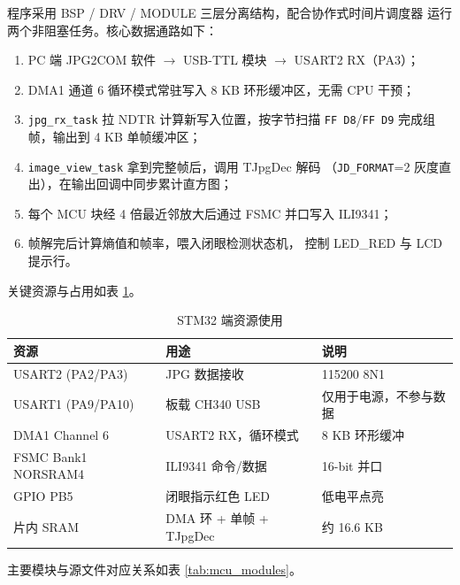 \documentclass[a4paper]{article}
\begin{document}
程序采用 BSP / DRV / MODULE 三层分离结构，配合协作式时间片调度器
运行两个非阻塞任务。核心数据通路如下：

\begin{enumerate}
\item PC 端 JPG2COM 软件 $\to$ USB-TTL 模块 $\to$ USART2 RX（PA3）；
\item DMA1 通道 6 循环模式常驻写入 8 KB 环形缓冲区，无需 CPU 干预；
\item \texttt{jpg\_rx\_task} 拉 NDTR 计算新写入位置，按字节扫描
\texttt{FF D8}/\texttt{FF D9} 完成组帧，输出到 4 KB 单帧缓冲区；
\item \texttt{image\_view\_task} 拿到完整帧后，调用 TJpgDec 解码
（\texttt{JD\_FORMAT}=2 灰度直出），在输出回调中同步累计直方图；
\item 每个 MCU 块经 4 倍最近邻放大后通过 FSMC 并口写入 ILI9341；
\item 帧解完后计算熵值和帧率，喂入闭眼检测状态机，
控制 LED\_RED 与 LCD 提示行。
\end{enumerate}

关键资源与占用如表 \ref{tab:mcu_res}。

\begin{table}[H]
\centering
\caption{STM32 端资源使用}
\label{tab:mcu_res}
\begin{tabular}{lll}
\toprule
资源 & 用途 & 说明 \\
\midrule
USART2 (PA2/PA3)   & JPG 数据接收        & 115200 8N1 \\
USART1 (PA9/PA10)  & 板载 CH340 USB      & 仅用于电源，不参与数据 \\
DMA1 Channel 6     & USART2 RX，循环模式 & 8 KB 环形缓冲 \\
FSMC Bank1 NORSRAM4 & ILI9341 命令/数据 & 16-bit 并口 \\
GPIO PB5           & 闭眼指示红色 LED    & 低电平点亮 \\
片内 SRAM          & DMA 环 + 单帧 + TJpgDec & 约 16.6 KB \\
\bottomrule
\end{tabular}
\end{table}

主要模块与源文件对应关系如表 \ref{tab:mcu_modules}。
\end{document}
